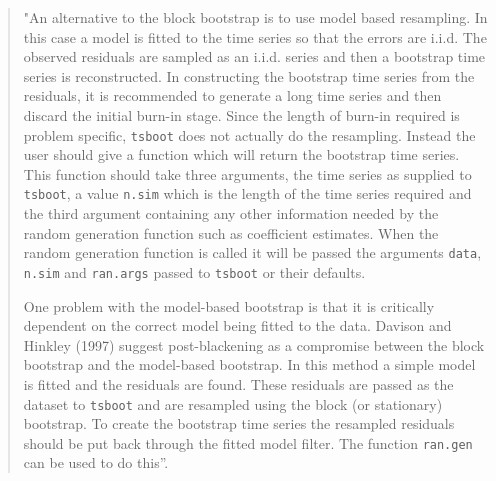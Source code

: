 \documentclass[
]{book}
\theoremstyle{break}
\theoremstyle{definition}
\theoremstyle{definition}
\theoremstyle{definition}
\theoremstyle{remark}
\begin{document}
\begin{quote}
"An alternative to the block bootstrap is to use
model based resampling. In this case a model is fitted
to the time series so that the errors are i.i.d. The
observed residuals are sampled as an i.i.d. series and
then a bootstrap time series is reconstructed. In constructing
the bootstrap time series from the residuals,
it is recommended to generate a long time series
and then discard the initial burn-in stage. Since
the length of burn-in required is problem specific,
\texttt{tsboot} does not actually do the resampling. Instead
the user should give a function which will return the
bootstrap time series. This function should take three
arguments, the time series as supplied to \texttt{tsboot}, a
value \texttt{n.sim} which is the length of the time series required
and the third argument containing any other
information needed by the random generation function
such as coefficient estimates. When the random
generation function is called it will be passed the arguments
\texttt{data}, \texttt{n.sim} and \texttt{ran.args} passed to \texttt{tsboot}
or their defaults.

One problem with the model-based bootstrap is
that it is critically dependent on the correct model
being fitted to the data. Davison and Hinkley (1997)
suggest post-blackening as a compromise between the
block bootstrap and the model-based bootstrap. In
this method a simple model is fitted and the residuals
are found. These residuals are passed as the dataset
to \texttt{tsboot} and are resampled using the block (or stationary)
bootstrap. To create the bootstrap time series
the resampled residuals should be put back through
the fitted model filter. The function \texttt{ran.gen} can be
used to do this''.
\end{quote}
\end{document}
